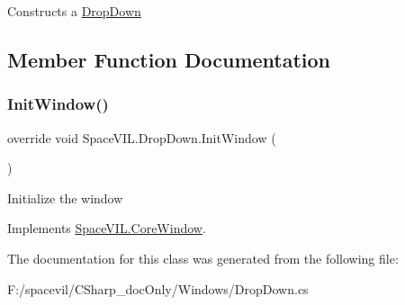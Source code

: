 Constructs a \mbox{\hyperlink{class_space_v_i_l_1_1_drop_down}{Drop\+Down}} 



\subsection{Member Function Documentation}
\mbox{\label{class_space_v_i_l_1_1_drop_down_a291f706e5ec6558798d20fa428b2ba91}} 
\subsubsection{\texorpdfstring{Init\+Window()}{InitWindow()}}
{\footnotesize\ttfamily override void Space\+V\+I\+L.\+Drop\+Down.\+Init\+Window (\begin{DoxyParamCaption}{ }\end{DoxyParamCaption})\hspace{0.3cm}{\ttfamily [virtual]}}



Initialize the window 



Implements \mbox{\hyperlink{class_space_v_i_l_1_1_core_window_aa3cf4ac54d9651b1149584dc81042824}{Space\+V\+I\+L.\+Core\+Window}}.



The documentation for this class was generated from the following file\+:\begin{DoxyCompactItemize}
\item 
F\+:/spacevil/\+C\+Sharp\+\_\+doc\+Only/\+Windows/Drop\+Down.\+cs\end{DoxyCompactItemize}
